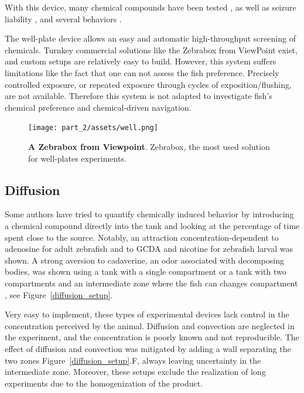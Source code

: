    With this device, many chemical compounds have been tested \cite{sallinen2009mptp,rihel2010zebrafish,kokel2010rapid}, as well as seizure liability \cite{winter2008validation}, and several behaviors \cite{farrell2011evaluation, shen2020rapid,schnorr2012measuring,pelkowski2011novel}.

    The well-plate device allows an easy and automatic high-throughput screening of chemicals. Turnkey commercial solutions like the Zebrabox from ViewPoint exist, and custom setups are relatively easy to build. However, this system suffers limitations like the fact that one can not assess the fish preference. Precisely controlled exposure, or repeated exposure through cycles of exposition/flushing, are not available. Therefore this system is not adapted to investigate fish's chemical preference and chemical-driven navigation.

    \begin{figure}[h]
      \centering
      \texttt{[image: part\_2/assets/well.png]}
      \caption{\textbf{A Zebrabox from Viewpoint}.  Zebrabox, the most used solution for well-plates experiments.}
      \label{gustatory_connection_schematic}
    \end{figure}

    \subsection{Diffusion}
    Some authors have tried to quantify chemically induced behavior by introducing a chemical compound directly into the tank and looking at the percentage of time spent close to the source. Notably, an attraction concentration-dependent to adenosine for adult zebrafish\cite{wakisaka2017adenosine} and to GCDA and nicotine for zebrafish larval \cite{krishnan2014right} was shown. A strong aversion to cadaverine, an odor associated with decomposing bodies, was shown using a tank with a single compartment or a tank with two compartments and an intermediate zone where the fish can changes compartment \cite{hussain2013high}, see Figure~\ref{diffusion_setup}.

    Very easy to implement, these types of experimental devices lack control in the concentration perceived by the animal. Diffusion and convection are neglected in the experiment, and the concentration is poorly known and not reproducible. The effect of diffusion and convection was mitigated \cite{hussain2013high} by adding a wall separating the two zones Figure~\ref{diffusion_setup}.F, always leaving uncertainty in the intermediate zone. Moreover, these setups exclude the realization of long experiments due to the homogenization of the product.


